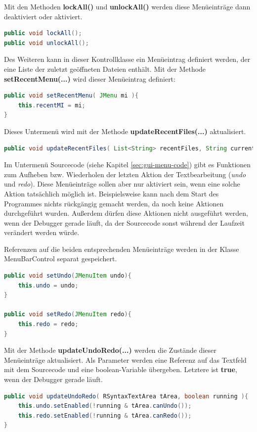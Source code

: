 Mit den Methoden \textbf{lockAll()} und \textbf{unlockAll()} werden diese Menüeinträge dann deaktiviert oder aktiviert.

\begin{lstlisting}[language=JAVA]
public void lockAll();
public void unlockAll();
\end{lstlisting}

Des Weiteren kann in dieser Kontrollklasse ein Menüeintrag definiert werden, der eine Liste der zuletzt geöffneten Dateien enthält. Mit der Methode \textbf{setRecentMenu(...)} wird dieser Menüeintrag definiert:
\begin{lstlisting}[language=JAVA]
public void setRecentMenu( JMenu mi ){
	this.recentMI = mi;
}
\end{lstlisting}

Dieses Untermenü wird mit der Methode \textbf{updateRecentFiles(...)} aktualisiert.
\begin{lstlisting}[language=JAVA]
public void updateRecentFiles( List<String> recentFiles, String currentFile );
\end{lstlisting}

Im Untermenü \glqq{}Sourcecode\grqq{} (siehe Kapitel \ref{sec:gui-menu-code}) gibt es Funktionen zum Aufheben bzw. Wiederholen der letzten Aktion der Textbearbeitung (\emph{undo} und \emph{redo}). Diese Menüeinträge sollen aber nur aktiviert sein, wenn eine solche Aktion tatsächlich möglich ist. Beispielsweise kann nach dem Start des Programmes nichts rückgängig gemacht werden, da noch keine Aktionen durchgeführt wurden. Außerdem dürfen diese Aktionen nicht ausgeführt werden, wenn der Debugger gerade läuft, da der Sourcecode sonst während der Laufzeit verändert werden würde.

Referenzen auf die beiden entsprechenden Menüeinträge werden in der Klasse MenuBarControl separat gespeichert.
\begin{lstlisting}[language=JAVA]
public void setUndo(JMenuItem undo){
	this.undo = undo;
}

public void setRedo(JMenuItem redo){
	this.redo = redo;
}
\end{lstlisting}

Mit der Methode \textbf{updateUndoRedo(...)} werden die Zustände dieser Menüeinträge aktualisiert. Als Parameter werden eine Referenz auf das Textfeld mit dem Sourcecode und eine boolean-Variable übergeben. Letztere ist \textbf{true}, wenn der Debugger gerade läuft.
\begin{lstlisting}[language=JAVA]
public void updateUndoRedo( RSyntaxTextArea tArea, boolean running ){
	this.undo.setEnabled(!running & tArea.canUndo());
	this.redo.setEnabled(!running & tArea.canRedo());
}
\end{lstlisting}

